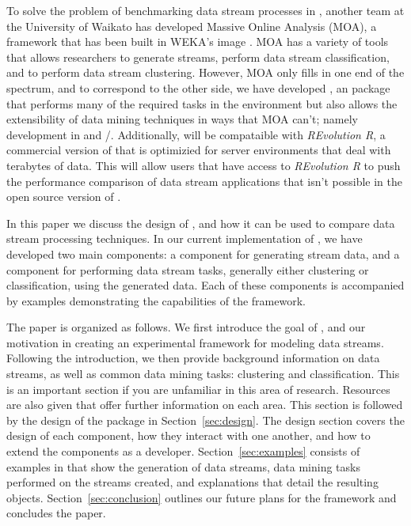 \documentclass[nojss]{jss}
\begin{document}
To solve the problem of benchmarking data stream processes in , another team at the University of Waikato has developed Massive Online Analysis (MOA), a framework that has been built in WEKA's image \citep{stream:Bifet+Holmes+Kirkby+Pfahringer:2010}. MOA has a variety of tools that allows researchers to generate streams, perform data stream classification, and to perform data stream clustering. However, MOA only fills in one end of the spectrum, and to correspond to the other side, we have developed , an  package that performs many of the required tasks in the  environment but also allows the extensibility of data mining techniques in ways that MOA can't; namely development in  and /. Additionally,  will be compataible with \textit{REvolution R}, a commercial version of  that is optimizied for server environments that deal with terabytes of data. This will allow users that have access to \textit{REvolution R} to push the performance comparison of data stream applications that isn't possible in the open source version of  \citep{stream:revolutionR:2010}.


In this paper we discuss the design of , and how it can be used to compare data stream processing techniques. In our current implementation of , we have developed two main components: a component for generating stream data, and a component for performing data stream tasks, generally either clustering or classification, using the generated data. Each of these components is accompanied by examples demonstrating the capabilities of the framework. 


The paper is organized as follows. We first introduce the goal of , and our motivation in creating an experimental framework for modeling data streams. Following the introduction, we then provide background information on data streams, as well as common data mining tasks: clustering and classification. This is an important section if you are unfamiliar in this area of research. Resources are also given that offer further information on each area. This section is followed by the design of the  package in Section~\ref{sec:design}. The design section covers the design of each component, how they interact with one another, and how to extend the components as a developer. Section~\ref{sec:examples} consists of examples in  that show the generation of data streams, data mining tasks performed on the streams created, and explanations that detail the resulting objects. Section~\ref{sec:conclusion} outlines our future plans for the framework and concludes the paper.
\end{document}
